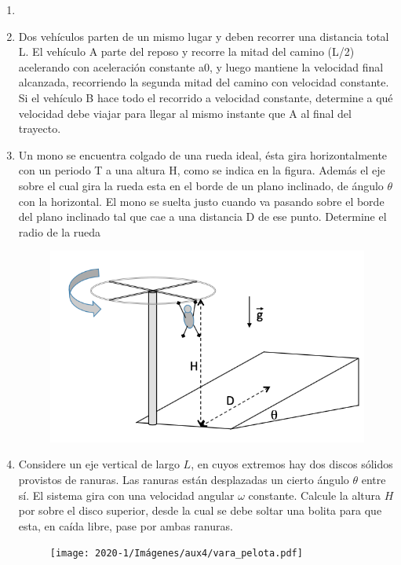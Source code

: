 \documentclass[letterpaper,11pt]{article}
\begin{document}
\vspace{-1cm}
\begin{enumerate}\setlength{\itemsep}{0.4cm}


\item[]
\item Dos vehículos parten de un mismo lugar y deben recorrer una distancia total L. El vehículo A parte del reposo y recorre la mitad del camino (L/2) acelerando con aceleración constante a0, y luego mantiene la velocidad final alcanzada, recorriendo la segunda mitad del camino con velocidad constante. Si el vehículo B hace todo el recorrido a velocidad constante, determine a qué velocidad debe viajar para llegar al mismo instante que A al final del trayecto. 

\item Un mono se encuentra colgado de una rueda ideal, ésta gira horizontalmente con un periodo T a una altura H, como se indica en la figura. Además el eje sobre el cual gira la rueda esta en el borde de un plano inclinado, de ángulo $\theta$ con la horizontal. El mono se suelta justo cuando va pasando sobre el borde del plano inclinado tal que cae a una distancia D de ese punto. Determine el radio de la rueda
\begin{figure}[h!]
        \centering
        \includegraphics[scale=0.3]{2022-1/auxiliares/Captura de Pantalla 2023-04-06 a la(s) 01.08.42.png}
\end{figure}
    
    \item Considere un eje vertical de largo $L$, en cuyos extremos hay dos discos sólidos provistos de ranuras. Las ranuras están desplazadas un cierto ángulo $\theta$ entre sí. El sistema gira con una velocidad angular $\omega$ constante. Calcule la altura $H$ por sobre el disco superior, desde la cual se debe soltar una bolita para que esta, en caída libre, pase por ambas ranuras.

\begin{figure}[h!]
    \centering
    \texttt{[image: 2020-1/Imágenes/aux4/vara\_pelota.pdf]}
\end{figure}

\end{enumerate}
\end{document}
